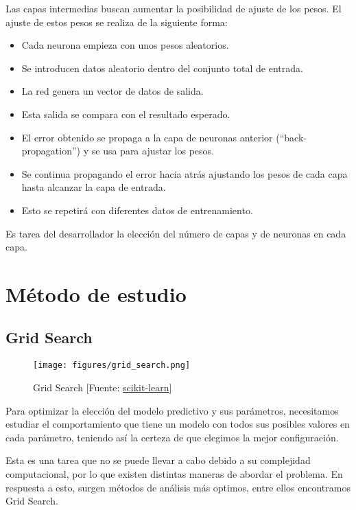 	Las capas intermedias buscan aumentar la posibilidad de ajuste de los pesos. El ajuste de estos pesos se realiza de la siguiente forma:

	\begin{itemize}
		\item Cada neurona empieza con unos pesos aleatorios.
		\item Se introducen datos aleatorio dentro del conjunto total de entrada.
		\item La red genera un vector de datos de salida.
		\item Esta salida se compara con el resultado esperado.
		\item El error obtenido se propaga a la capa de neuronas anterior (``back-propagation'') y se usa para ajustar los pesos.
		\item Se continua propagando el error hacia atrás ajustando los pesos de cada capa hasta alcanzar la capa de entrada.
		\item Esto se repetirá con diferentes datos de entrenamiento.
 	\end{itemize}

	Es tarea del desarrollador la elección del número de capas y de neuronas en cada capa.

\section{Método de estudio}
\label{makereference5.4}
	\subsection{Grid Search}

	\begin{figure}[htb]
		\begin{center}
			\texttt{[image: figures/grid\_search.png]}
			\caption{Grid Search [Fuente: \href{www.scikit-learn.org}{scikit-learn}] \label{grid}}
		\end{center}
	\end{figure}

	Para optimizar la elección del modelo predictivo y sus parámetros, necesitamos estudiar el comportamiento que tiene un modelo con todos sus posibles valores en cada parámetro, teniendo así la certeza de que elegimos la mejor configuración.

	Esta es una tarea que no se puede llevar a cabo debido a su complejidad computacional, por lo que existen distintas maneras de abordar el problema. En respuesta a esto, surgen métodos de análisis más optimos, entre ellos encontramos Grid Search.

